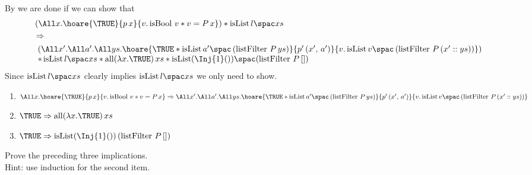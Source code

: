  By  we are done if we can show that
 \begin{align*}
 & \left( \All x. \hoare{\TRUE}{p \, x}{v. \operatorname{isBool} \, v \ast v = P \, x}\right)
\ast \isList {l} {xs}  \\
& \implies \\
& \begin{array}{l}
\left(  \All x'. \All a'. \All ys. \hoare {\TRUE \ast \isList {a'} {\left( \operatorname{listFilter} \, P \, ys \right)}}{p' \, (x', \, a')}{v.\isList {v} {\left( \operatorname{listFilter} \, P \, (x'::ys) \right)}}
\right) \\
\ast \isList {l} {xs} \ast \operatorname{all} (\lambda x . \TRUE) \, xs \ast \isList {(\Inj{1}())} {(\operatorname{listFilter} \, P \, [])} \end{array}
 \end{align*}
Since $\isList {l} {xs}$ clearly implies $\isList {l} {xs}$ we only need to show.
\begin{enumerate}
\item $\All x. \hoare{\TRUE}{p \, x}{v. \operatorname{isBool} \, v \ast v = P \, x} \\
\implies \All x'. \All a'. \All ys. \hoare {\TRUE \ast \isList {a'} {\left( \operatorname{listFilter} \, P \, ys \right)}}{p' \, (x', \, a')}{v.\isList {v} {\left( \operatorname{listFilter} \, P \, (x'::ys) \right)}}$
\item $\TRUE \implies \operatorname{all} (\lambda x . \TRUE) \, xs$
\item $\TRUE \implies \operatorname{isList} (\Inj{1}()) \, (\operatorname{listFilter} \, P \, [])$
\end{enumerate}

\begin{exercise}
  Prove the preceding three implications.\\
  Hint: use induction for the second item.
\end{exercise}

